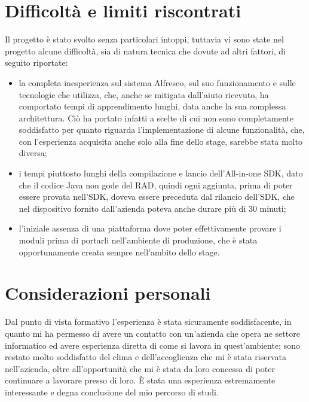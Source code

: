 \section{Difficoltà e limiti riscontrati}
Il progetto è stato svolto senza particolari intoppi, tuttavia vi sono state nel progetto alcune difficoltà, sia di natura tecnica che dovute ad altri fattori, di seguito riportate:
\begin{itemize}
\item la completa inesperienza sul sistema Alfresco, sul suo funzionamento e sulle tecnologie che utilizza, che, anche se mitigata dall'aiuto ricevuto, ha comportato tempi di apprendimento lunghi, data anche la sua complessa architettura.
Ciò ha portato infatti a scelte di cui non sono completamente soddisfatto per quanto riguarda l'implementazione di alcune funzionalità, che, con l'esperienza acquisita anche solo alla fine dello stage, sarebbe stata molto diversa;
\item i tempi piuttosto lunghi della compilazione e lancio dell'All-in-one SDK, dato che il codice Java non gode del RAD, quindi ogni aggiunta, prima di poter essere provata nell'SDK, doveva essere preceduta dal rilancio dell'SDK, che nel dispositivo fornito dall'azienda poteva anche durare più di 30 minuti;
\item l'iniziale assenza di una piattaforma dove poter effettivamente provare i moduli prima di portarli nell'ambiente di produzione, che è stata opportunamente creata sempre nell'ambito dello stage.
\end{itemize}
\section{Considerazioni personali}
Dal punto di vista formativo l'esperienza è stata sicuramente soddisfacente, in quanto mi ha permesso di avere un contatto con un'azienda che opera ne settore informatico ed avere esperienza diretta di come si lavora in quest'ambiente; sono restato molto soddisfatto del clima e dell'accoglienza che mi è stata riservata nell'azienda, oltre all'opportunità che mi è stata da loro concessa di poter continuare a lavorare presso di loro.
È stata una esperienza estremamente interessante e degna conclusione del mio percorso di studi.